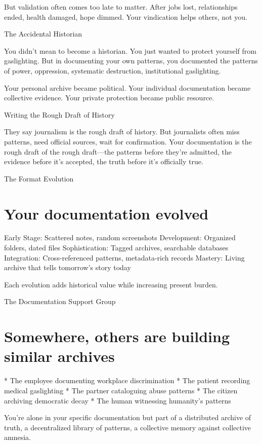 \documentclass[12pt,oneside]{book}
\begin{document}
But validation often comes too late to matter. After jobs lost, relationships ended, health damaged, hope dimmed. Your vindication helps others, not you.

The Accidental Historian

You didn't mean to become a historian. You just wanted to protect yourself from gaslighting. But in documenting your own patterns, you documented the patterns of power, oppression, systematic destruction, institutional gaslighting.

Your personal archive became political. Your individual documentation became collective evidence. Your private protection became public resource.

Writing the Rough Draft of History

They say journalism is the rough draft of history. But journalists often miss patterns, need official sources, wait for confirmation. Your documentation is the rough draft of the rough draft---the patterns before they're admitted, the evidence before it's accepted, the truth before it's officially true.

The Format Evolution

\section{Your documentation evolved}

Early Stage: Scattered notes, random screenshots Development: Organized folders, dated files Sophistication: Tagged archives, searchable databases Integration: Cross-referenced patterns, metadata-rich records Mastery: Living archive that tells tomorrow's story today

Each evolution adds historical value while increasing present burden.

The Documentation Support Group

\section{Somewhere, others are building similar archives}

                    * The employee documenting workplace discrimination
                    * The patient recording medical gaslighting
                    * The partner cataloguing abuse patterns
                    * The citizen archiving democratic decay
                    * The human witnessing humanity's patterns

You're alone in your specific documentation but part of a distributed archive of truth, a decentralized library of patterns, a collective memory against collective amnesia.
\end{document}
